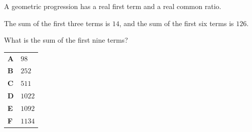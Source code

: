 \documentclass[11pt,a4paper]{article}
\begin{document}
\clearpage
\thispagestyle{djspaper}
\vspace*{8pt}
\begin{enumerate}[label=\textbf{\arabic*.},leftmargin=*,itemsep=0pt,start=6]
A geometric progression has a real first term and a real common ratio.

The sum of the first three terms is $14$, and the sum of the first six terms is $126$.

What is the sum of the first nine terms?

\par\vspace*{12pt}
\begin{tabularx}{\linewidth}{@{}>{\bfseries}l Y@{}}
A &
$98$
\\[0.8em]
B &
$252$
\\[0.8em]
C &
$511$
\\[0.8em]
D &
$1022$
\\[0.8em]
E &
$1092$
\\[0.8em]
F &
$1134$
\\
\end{tabularx}
\end{enumerate}
\clearpage
\thispagestyle{djspaper}
\vspace*{8pt}
\end{document}
